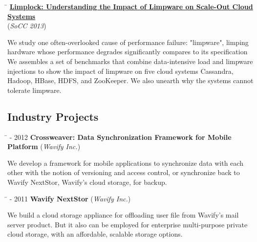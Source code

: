 \documentclass[10pt]{article} %
\begin{document}
\begin{tabbing}
\hspace{2.5cm} \=  \> \href{http://ucare.cs.uchicago.edu/pdf/socc13-limplock.pdf}{\textbf{Limplock: Understanding the Impact of Limpware on Scale-Out Cloud Systems}} \\
\>\+ (\textit{SoCC 2013}) \\
\begin{minipage}{\smallertextwidth}
We study one often-overlooked cause of performance failure: "limpware", limping
hardware whose performance degrades significantly compares to its specification
We assembles a set of benchmarks that combine data-intensive load and limpware
injections to show the impact of limpware on five cloud systems Cassandra,
Hadoop, HBase, HDFS, and ZooKeeper. We also unearth why the systems cannot
tolerate limpware.
\end{minipage}
\end{tabbing}

\subsection{Industry Projects}

\begin{tabbing}
\hspace{2.5cm} \=  - 2012 \>\+ \textbf{Crossweaver: Data Synchronization Framework for Mobile Platform} (\textit{Wavify Inc.}) \\
\begin{minipage}{\smallertextwidth}
We develop a framework for mobile applications to synchronize data with
each other with the notion of versioning and access control, or synchronize back
to Wavify NextStor, Wavify's cloud storage, for backup.
\end{minipage}
\end{tabbing}

\begin{tabbing}
\hspace{2.5cm} \=  - 2011 \>\+ \textbf{Wavify NextStor} (\textit{Wavify Inc.}) \\
\begin{minipage}{\smallertextwidth}
We build a cloud storage appliance for offloading user file from Wavify's
mail server product. But it also can be employed for enterprise multi-purpose
private cloud storage, with an affordable, scalable storage options.
\end{minipage}
\end{tabbing}
\end{document}
